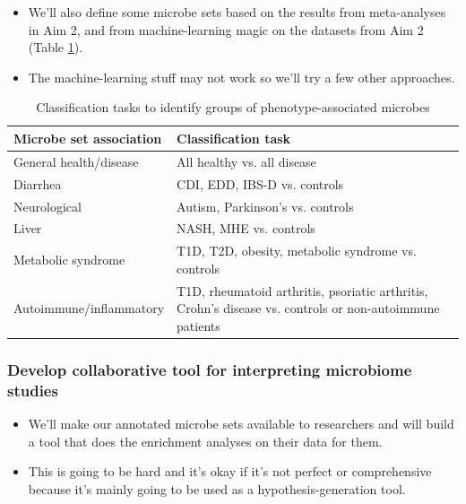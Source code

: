 \documentclass[12pt]{article}
\begin{document}
\begin{itemize}
\item We'll also define some microbe sets based on the results from meta-analyses in Aim 2, and from machine-learning magic on the datasets from Aim 2 (Table \ref{tab:classifications}).
\item The machine-learning stuff may not work so we'll try a few other approaches. 
\end{itemize}

{
\renewcommand{\arraystretch}{1.2}
\begin{table}[H]
\begin{center}
\begin{tabular}{ m{6cm} m{10cm} }
	\hline
	\textbf{Microbe set association} & \textbf{Classification task} \\
	\hline
	General health/disease & All healthy vs. all disease \\
	Diarrhea & CDI, EDD, IBS-D vs. controls \\
	Neurological & Autism, Parkinson's vs. controls \\
	Liver & NASH, MHE vs. controls\\
	Metabolic syndrome & T1D, T2D, obesity, metabolic syndrome vs. 
	controls \\
	Autoimmune/inflammatory & T1D, rheumatoid arthritis, psoriatic arthritis, Crohn's disease 
	vs. controls or non-autoimmune patients \\
	\hline
\end{tabular}
\caption{Classification tasks to identify groups of phenotype-associated microbes}\label{tab:classifications}
\end{center}
\end{table}
}

\subsubsection{Develop collaborative tool for interpreting microbiome studies}
\begin{itemize}
\item We'll make our annotated microbe sets available to researchers and will build a 
tool that does the enrichment analyses on their data for them.
\item This is going to be hard and it's okay if it's not perfect or comprehensive
because it's mainly going to be used as a hypothesis-generation tool.
\end{itemize}
\end{document}
